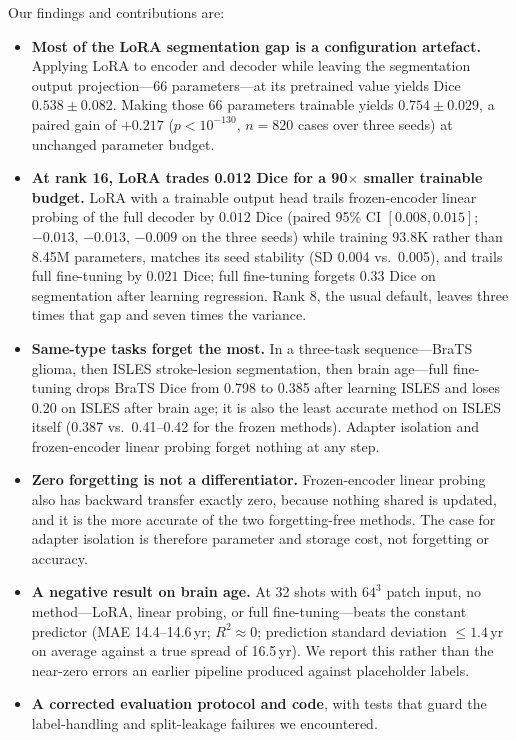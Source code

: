 \documentclass[journal,twoside,web]{ieeecolor}
\begin{document}
Our findings and contributions are:
\begin{itemize}
\item \textbf{Most of the LoRA segmentation gap is a configuration artefact.} Applying LoRA to encoder and decoder while leaving the segmentation output projection---66 parameters---at its pretrained value yields Dice $0.538\pm0.082$. Making those 66 parameters trainable yields $0.754\pm0.029$, a paired gain of $+0.217$ ($p<10^{-130}$, $n=820$ cases over three seeds) at unchanged parameter budget.
\item \textbf{At rank 16, LoRA trades 0.012 Dice for a 90$\times$ smaller trainable budget.} LoRA with a trainable output head trails frozen-encoder linear probing of the full decoder by $0.012$ Dice (paired 95\% CI $[0.008, 0.015]$; $-0.013$, $-0.013$, $-0.009$ on the three seeds) while training 93.8K rather than 8.45M parameters, matches its seed stability (SD 0.004 vs.\ 0.005), and trails full fine-tuning by $0.021$ Dice; full fine-tuning forgets $0.33$ Dice on segmentation after learning regression. Rank 8, the usual default, leaves three times that gap and seven times the variance.
\item \textbf{Same-type tasks forget the most.} In a three-task sequence---BraTS glioma, then ISLES stroke-lesion segmentation, then brain age---full fine-tuning drops BraTS Dice from 0.798 to 0.385 after learning ISLES and loses 0.20 on ISLES after brain age; it is also the least accurate method on ISLES itself (0.387 vs.\ 0.41--0.42 for the frozen methods). Adapter isolation and frozen-encoder linear probing forget nothing at any step.
\item \textbf{Zero forgetting is not a differentiator.} Frozen-encoder linear probing also has backward transfer exactly zero, because nothing shared is updated, and it is the more accurate of the two forgetting-free methods. The case for adapter isolation is therefore parameter and storage cost, not forgetting or accuracy.
\item \textbf{A negative result on brain age.} At 32 shots with $64^3$ patch input, no method---LoRA, linear probing, or full fine-tuning---beats the constant predictor (MAE 14.4--14.6\,yr; $R^2\approx 0$; prediction standard deviation $\le 1.4$\,yr on average against a true spread of 16.5\,yr). We report this rather than the near-zero errors an earlier pipeline produced against placeholder labels.
\item \textbf{A corrected evaluation protocol and code}, with tests that guard the label-handling and split-leakage failures we encountered.
\end{itemize}
\end{document}
